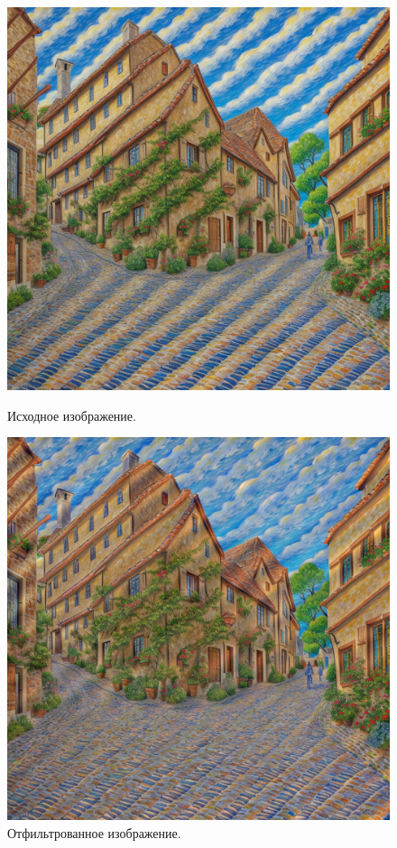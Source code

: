 \documentclass[a4paper]{article}
\begin{document}
\begin{figure}[H]
  \centering
  \begin{minipage}{0.49\textwidth}
    \centering
    \includegraphics[width=\textwidth]{src/13.png}
    \caption{Исходное изображение.}  
  \end{minipage}
  \begin{minipage}{0.49\textwidth}
    \centering
    \includegraphics[width=\textwidth]{src/filtered.png}
    \caption{Отфильтрованное изображение.}  
  \end{minipage}
\end{figure}
\end{document}
